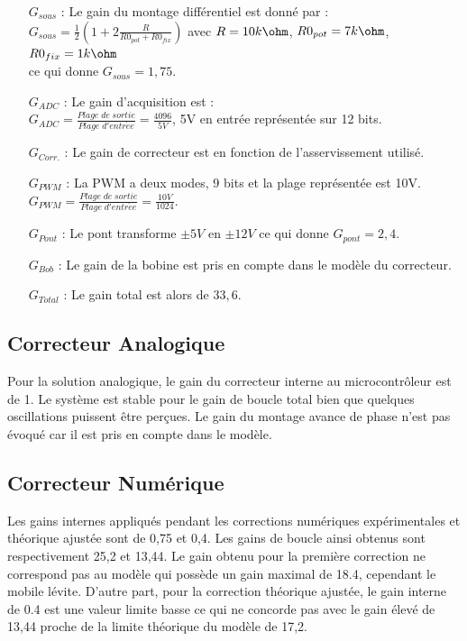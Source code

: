 \documentclass[11pt, french]{article} %
\begin{document}
\noindent 
\begin{enumerate}
\item[$G_{sous}$ : ]
Le gain du montage différentiel est donné par : \\ $G_{sous}=\frac{1}{2}\left( 1+2 \frac{R}{R0_{pot}+R0_{fix}}\right)$ avec $R=10k\ohm$, $R0_{pot}=7k\ohm$, $R0_{fix}=1k\ohm$ \\ ce qui donne $G_{sous}=1,75$.
\item[$G_{ADC}$ : ]
Le gain d'acquisition est : \\ $G_{ADC}= \frac{Plage \; de \; sortie}{Plage \; d'entr \acute{e} e}=\frac{4096}{5V}$, 5V en entrée représentée sur 12 bits. 
\item[$G_{Corr.}$ : ]
Le gain de correcteur est en fonction de l'asservissement utilisé.
\item[$G_{PWM}$ : ]
La PWM a deux modes, 9 bits et la plage représentée est 10V. \\ $G_{PWM}= \frac{Plage \; de \; sortie}{Plage \; d'entr \acute{e} e}=\frac{10V}{1024}$.
\item[$G_{Pont}$ : ]
Le pont transforme $\pm5V$ en $\pm12V$ ce qui donne $G_{pont}=2,4$.
\item[$G_{Bob}$ : ]
Le gain de la bobine est pris en compte dans le modèle du correcteur. 
\item[$G_{Total}$ : ]
Le gain total est alors de $33,6$.
\end{enumerate}

\subsection{Correcteur Analogique}
Pour la solution analogique, le gain du correcteur interne au microcontrôleur est de 1. Le système est stable pour le gain de boucle total bien que quelques oscillations puissent être perçues. Le gain du montage avance de phase n'est pas évoqué car il est pris en compte dans le modèle.
\subsection{Correcteur Numérique}
Les gains internes appliqués pendant les corrections numériques expérimentales et théorique ajustée sont de 0,75 et 0,4. Les gains de boucle ainsi obtenus sont respectivement 25,2 et 13,44. Le gain obtenu pour la première correction ne correspond pas au modèle qui possède un gain maximal de 18.4, cependant le mobile lévite. D'autre part, pour la correction théorique ajustée, le gain interne de 0.4 est une valeur limite basse ce qui ne concorde pas avec le gain élevé de 13,44 proche de la limite théorique du modèle de 17,2.
\end{document}
